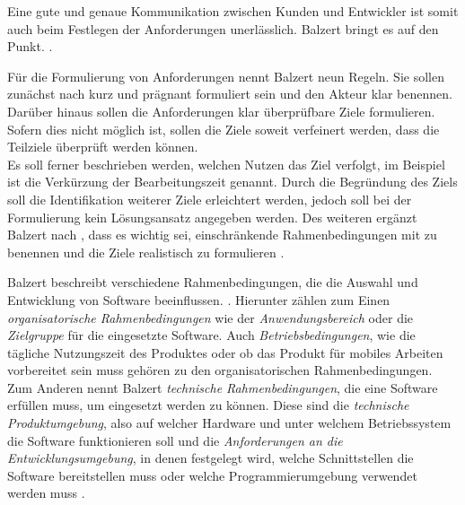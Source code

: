 Eine gute und genaue Kommunikation zwischen Kunden und Entwickler ist somit auch beim Festlegen der Anforderungen unerlässlich. 
Balzert bringt es auf den Punkt. 
 \citep[][455]{Balzert2010}.

Für die Formulierung von Anforderungen nennt Balzert neun Regeln. Sie sollen zunächst nach \cite[][S. 100 ff.]{Pohl2007} kurz und prägnant formuliert sein und den Akteur klar benennen. Darüber hinaus sollen die Anforderungen klar überprüfbare Ziele formulieren. Sofern dies nicht möglich ist, sollen die Ziele soweit verfeinert werden, dass die Teilziele überprüft werden können. \\
Es soll ferner beschrieben werden, welchen Nutzen das Ziel verfolgt, im Beispiel ist die Verkürzung der Bearbeitungszeit genannt. Durch die Begründung des Ziels soll die Identifikation weiterer Ziele erleichtert werden, jedoch soll bei der Formulierung kein Lösungsansatz angegeben werden. Des weiteren ergänzt Balzert nach \cite[][S. 100 f.]{Rupp2007}, dass es wichtig sei, einschränkende Rahmenbedingungen mit zu benennen und die Ziele realistisch zu formulieren \citep[vgl.][S. 457 ff.]{Balzert2010}.


Balzert beschreibt verschiedene Rahmenbedingungen, die die Auswahl und Entwicklung von Software beeinflussen. \citep[][459]{Balzert2010}.
Hierunter zählen zum Einen \textit{organisatorische Rahmenbedingungen} wie der \textit{Anwendungsbereich} oder die \textit{Zielgruppe} für die eingesetzte Software. Auch \textit{Betriebsbedingungen}, wie die tägliche Nutzungszeit des Produktes oder ob das Produkt \zb für mobiles Arbeiten vorbereitet sein muss \citep[vgl.][S. 459 f.]{Balzert2010} gehören zu den organisatorischen Rahmenbedingungen. 
Zum Anderen nennt Balzert \textit{technische Rahmenbedingungen}, die eine Software erfüllen muss, um eingesetzt werden zu können. Diese sind die \textit{technische Produktumgebung}, also auf welcher Hardware und unter welchem Betriebssystem die Software funktionieren soll und die \textit{Anforderungen an die Entwicklungsumgebung}, in denen \ua festgelegt wird, welche Schnittstellen die Software bereitstellen muss oder welche Programmierumgebung verwendet werden muss \citep[vgl.][S. 460 f.]{Balzert2010}.

